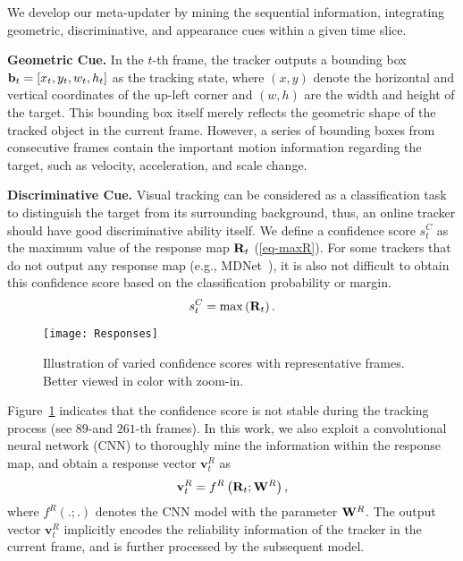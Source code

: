 \documentclass[10pt,twocolumn,letterpaper]{article}
\begin{document}
We develop our meta-updater by mining the sequential information, integrating geometric,
discriminative, and appearance cues within a given time slice.

\noindent \textbf{Geometric Cue.} In the $t$-th frame, the tracker outputs a bounding
box ${{\bf{b}}_t} = \left[ {{x_t},{y_t},{w_t},{h_t}} \right]$ as the tracking state, where
$\left( {x,y} \right)$ denote the horizontal and vertical coordinates of the up-left corner
and $\left( {w,h} \right)$ are the width and height of the target.
This bounding box itself merely reflects the geometric shape of the tracked object in the
current frame.
However, a series of bounding boxes from consecutive frames contain the important motion
information regarding the target, such as velocity, acceleration, and scale change.

\noindent \textbf{Discriminative Cue.} Visual tracking can be considered as a classification
task to distinguish the target from its surrounding background, thus, an online tracker should
have good discriminative ability itself. We define a confidence score $s_t^C$
as the maximum value of the response map ${{\bf{R}}_t}$ (\ref{eq-maxR}).
For some trackers that do not output any response map (e.g., MDNet~\cite{Nam-CVPR16-MDNet}),
it is also not difficult to obtain this confidence score based on the classification probability or margin.
\begin{equation}
s_t^C = \max \left( {{{\bf{R}}_t}} \right).
\label{eq-maxR}
\end{equation}

\begin{figure}[t]
	\begin{center}
		\texttt{[image: Responses]}
	\end{center}
	\vspace{-3mm}
	\caption{Illustration of varied confidence scores with representative frames.
	Better viewed in color with zoom-in.}
	\label{fig-response}
	\vspace{-4mm}
\end{figure}

Figure~\ref{fig-response} indicates that the confidence score is not stable during the tracking
process (see $89$-and $261$-th frames).
In this work, we also exploit a convolutional neural network (CNN) to thoroughly mine the
information within the response map, and obtain a response vector $\mathbf{v}_t^R$ as
\begin{equation}
\mathbf{v}_t^R = {f^R}\left( {{{\bf{R}}_t};{{\bf{W}}^R}} \right),
\end{equation}
where ${f^R}\left( {.;.} \right)$ denotes the CNN model with the parameter ${{{\bf{W}}^R}}$.
The output vector $\mathbf{v}_t^R$ implicitly encodes the reliability information of the tracker in
the current frame, and is further processed by the subsequent model.
\end{document}
